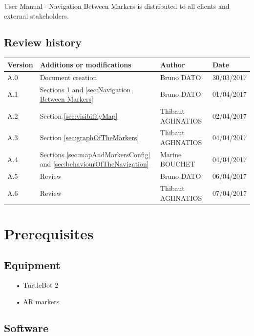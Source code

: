 \documentclass[10pt,a4paper]{article}
\begin{document}
User Manual - Navigation Between Markers is distributed to all clients and external stakeholders.

\subsection*{Review history}

\begin{center}
    \begin{tabular}{| l | l | l | l |}
    \hline
     \rowcolor{gray} Version & Additions or modifications & Author & Date \\ \hline
    A.0 & Document creation & Bruno DATO & 30/03/2017\\ \hline
    A.1 & Sections \ref{sec:Prerequisites} and \ref{sec:Navigation Between Markers} & Bruno DATO & 01/04/2017\\ \hline
    A.2 & Section \ref{sec:visibilityMap} & Thibaut AGHNATIOS & 02/04/2017\\ \hline
    A.3 & Section \ref{sec:graphOfTheMarkers} & Thibaut AGHNATIOS & 04/04/2017\\ \hline
    A.4 & Sections \ref{sec:mapAndMarkersConfig} and \ref{sec:behaviourOfTheNavigation} & Marine BOUCHET & 04/04/2017\\ \hline
    A.5 & Review  & Bruno DATO & 06/04/2017\\ \hline
    A.6 & Review  & Thibaut AGHNATIOS & 07/04/2017\\ \hline
     
    \end{tabular}
\end{center}

\newpage
\tableofcontents
\newpage
	

\section{Prerequisites}
\label{sec:Prerequisites}

\subsection{Equipment}

\begin{itemize}
\item[•] TurtleBot 2
\item[•] AR markers 
\end{itemize}

\subsection{Software}
\end{document}
